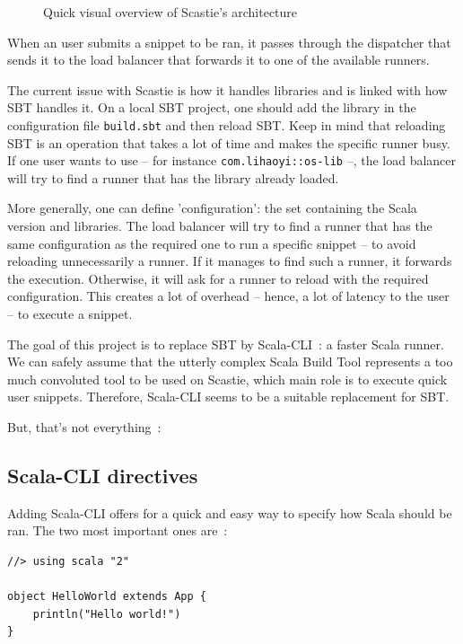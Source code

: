 \documentclass{article}
\begin{document}
\begin{figure}[H]
    \centering
    
    \label{fig:scastie_architecture}
    \caption{Quick visual overview of Scastie's architecture}
\end{figure}

When an user submits a snippet to be ran, it passes through the dispatcher that sends it to the load balancer that forwards it to one of the
available runners.

The current issue with Scastie is how it handles libraries and is linked with how SBT handles it.
On a local SBT project, one should add the library in the configuration file \lstinline{build.sbt} and then reload SBT.
Keep in mind that reloading SBT is an operation that takes a lot of time and makes the specific runner busy.
If one user wants to use -- for instance \lstinline{com.lihaoyi::os-lib} --, the load balancer will try to find a runner that has
the library already loaded.

More generally, one can define 'configuration': the set containing the Scala version and libraries. The load balancer will try to find a
runner that has the same configuration as the required one to run a specific snippet -- to avoid reloading unnecessarily a runner.
If it manages to find such a runner, it forwards the execution. Otherwise, it will ask for a runner to reload with the
required configuration. This creates a lot of overhead -- hence, a lot of latency to the user -- to execute a snippet.

The goal of this project is to replace SBT by Scala-CLI~: a faster Scala runner. We can safely assume that the utterly complex Scala Build
Tool represents a too much convoluted tool to be used on Scastie, which main role is to execute quick user snippets.
Therefore, Scala-CLI seems to be a suitable replacement for SBT.

But, that's not everything~:

\subsection{Scala-CLI directives}

Adding Scala-CLI offers for a quick and easy way to specify how Scala should be ran. The two most important ones are~:

\begin{lstlisting}[style=sc]
//> using scala "2"

object HelloWorld extends App {
    println("Hello world!")
}
\end{lstlisting}
\end{document}
